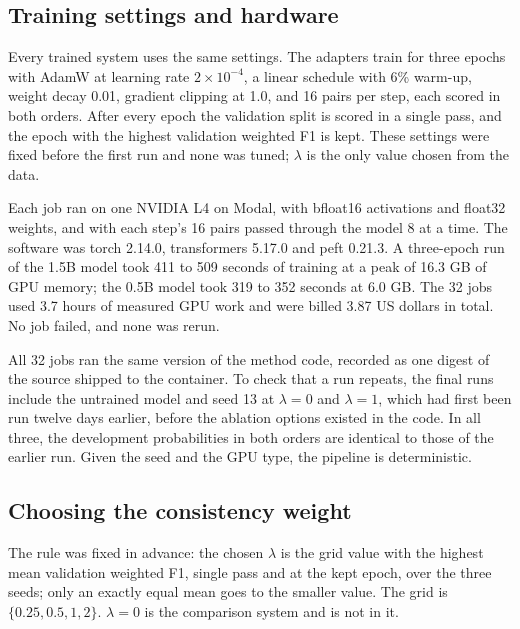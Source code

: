 \subsection{Training settings and hardware}
\label{sec:setup-training}

Every trained system uses the same settings. The adapters train for three epochs with AdamW at learning rate $2 \times 10^{-4}$, a linear schedule with 6\% warm-up, weight decay 0.01, gradient clipping at 1.0, and 16 pairs per step, each scored in both orders. After every epoch the validation split is scored in a single pass, and the epoch with the highest validation weighted F1 is kept. These settings were fixed before the first run and none was tuned; $\lambda$ is the only value chosen from the data. %

Each job ran on one NVIDIA L4 on Modal, with bfloat16 activations and float32 weights, and with each step's 16 pairs passed through the model 8 at a time. The software was torch 2.14.0, transformers 5.17.0 and peft 0.21.3. %
A three-epoch run of the 1.5B model took 411 to 509 seconds of training at a peak of 16.3 GB of GPU memory; the 0.5B model took 319 to 352 seconds at 6.0 GB. %
The 32 jobs used 3.7 hours of measured GPU work and were billed 3.87 US dollars in total. %
No job failed, and none was rerun.

All 32 jobs ran the same version of the method code, recorded as one digest of the source shipped to the container. To check that a run repeats, the final runs include the untrained model and seed 13 at $\lambda = 0$ and $\lambda = 1$, which had first been run twelve days earlier, before the ablation options existed in the code. In all three, the development probabilities in both orders are identical to those of the earlier run. %
Given the seed and the GPU type, the pipeline is deterministic.

\subsection{Choosing the consistency weight}
\label{sec:setup-lambda}

The rule was fixed in advance: the chosen $\lambda$ is the grid value with the highest mean validation weighted F1, single pass and at the kept epoch, over the three seeds; only an exactly equal mean goes to the smaller value. The grid is $\{0.25, 0.5, 1, 2\}$. $\lambda = 0$ is the comparison system and is not in it.

